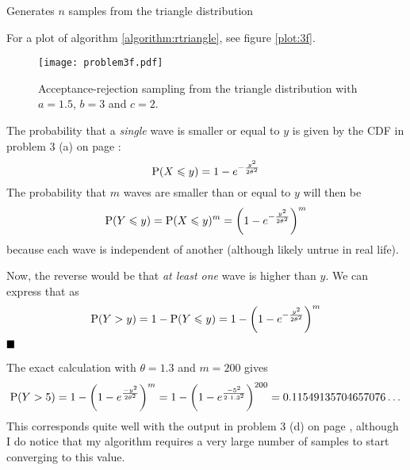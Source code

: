 \documentclass[a4paper,english,12pt]{article}
\begin{document}
\begin{algorithm}
  \caption{Generates $n$ samples from the triangle distribution}
  \label{algorithm:rtriangle}
  \begin{algorithmic}[1]
        \State {}
      \Else
        \State {}
      \EndIf
    \EndFunction
        \Repeat
           
      \EndFor
      \State {}
    \EndFunction
  \end{algorithmic}
\end{algorithm}

For a plot of algorithm \vref{algorithm:rtriangle}, see figure \vref{plot:3f}.

\begin{figure}
  \centering
  \texttt{[image: problem3f.pdf]}
  \caption{Acceptance-rejection sampling from the triangle distribution with
  $a=1.5$, $b=3$ and $c=2$.}
  \label{plot:3f}
\end{figure}

The probability that a \textit{single} wave is smaller or equal to $y$ is given
by the CDF in problem 3 (a) on page \pageref{problem:3a}:
\[
  \mathrm{P}(X\leqslant y) = 1 - e^{-\frac{y^2}{2\theta^2}}
\]
The probability that $m$ waves are smaller than or equal to $y$ will then be
\[
  \mathrm{P}(Y \leqslant y)
    = \mathrm{P}(X\leqslant y)^m
    = \left( 1 - e^{-\frac{y^2}{2\theta^2}} \right)^m
\]
because each wave is independent of another (although likely untrue in real
life).

Now, the reverse would be that \textit{at least one} wave is higher than $y$.
We can express that as
\[
  \mathrm{P}(Y > y)
    = 1 - \mathrm{P}(Y \leqslant y)
    = 1 - \left(1 - e^{-\frac{y^2}{2\theta^2}} \right)^m
\]
$\hfill\blacksquare$

The exact calculation with $\theta=1.3$ and $m=200$ gives
\[
  \mathrm{P}(Y>5)
    = 1 - \left(1 - e^{\frac{-y^2}{2\theta^2}} \right)^m
    = 1 - \left(1 - e^{\frac{-5^2}{2\cdot1.3^2}} \right)^{200}
    = 0.11549135704657076\dots
\]
This corresponds quite well with the output in problem 3 (d) on page
\pageref{problem:3d}, although I do notice that my algorithm requires a very
large number of samples to start converging to this value.
\end{document}
